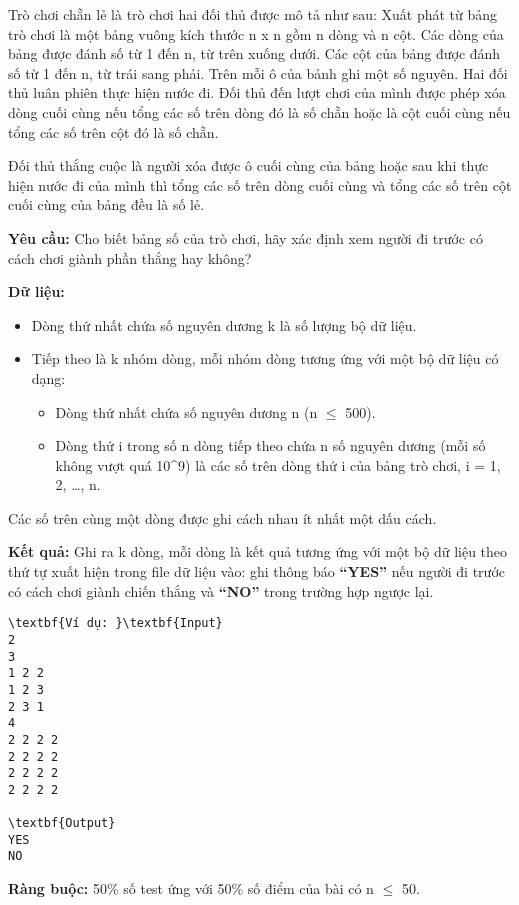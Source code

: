 

Trò chơi chẵn lẻ là trò chơi hai đối thủ được mô tả như sau: Xuất phát từ bảng trò chơi là một bảng vuông kích thước n x n gồm n dòng và n cột. Các dòng của bảng được đánh số từ 1 đến n, từ trên xuống dưới. Các cột của bảng được đánh số từ 1 đến n, từ trái sang phải. Trên mỗi ô của bảnh ghi một số nguyên. Hai đối thủ luân phiên thực hiện nước đi. Đối thủ đến lượt chơi của mình được phép xóa dòng cuối cùng nếu tổng các số trên dòng đó là số chẵn hoặc là cột cuối cùng nếu tổng các số trên cột đó là số chẵn.

Đối thủ thắng cuộc là người xóa được ô cuối cùng của bảng hoặc sau khi thực hiện nước đi của mình thì tổng các số trên dòng cuối cùng và tổng các số trên cột cuối cùng của bảng đều là số lẻ.

\textbf{Yêu cầu: } Cho biết bảng số của trò chơi, hãy xác định xem người đi trước có cách chơi giành phần thắng hay không?

\textbf{Dữ liệu: }
\begin{itemize}
	\item Dòng thứ nhất chứa số nguyên dương k là số lượng bộ dữ liệu.
	\item Tiếp theo là k nhóm dòng, mỗi nhóm dòng tương ứng với một bộ dữ liệu có dạng:
\begin{itemize}
	\item Dòng thứ nhất chứa số nguyên dương n (n  $\le$  500).
	\item Dòng thứ i trong số n dòng tiếp theo chứa n số nguyên dương (mỗi số không vượt quá 10\textasciicircum9) là các số trên dòng thứ i của bảng trò chơi, i = 1, 2, …, n.
\end{itemize}
\end{itemize}

Các số trên cùng một dòng được ghi cách nhau ít nhất một dấu cách.

\textbf{Kết quả: } Ghi ra k dòng, mỗi dòng là kết quả tương ứng với một bộ dữ liệu theo thứ tự xuất hiện trong file dữ liệu vào: ghi thông báo \textbf{ “YES” } nếu người đi trước có cách chơi giành chiến thắng và \textbf{ “NO” } trong trường hợp ngược lại.
\begin{verbatim}
\textbf{Ví dụ: }\textbf{Input}
2
3
1 2 2
1 2 3
2 3 1
4
2 2 2 2
2 2 2 2
2 2 2 2
2 2 2 2

\textbf{Output}
YES
NO\end{verbatim}

\textbf{Ràng buộc: } 50\% số test ứng với 50\% số điểm của bài có n  $\le$  50.
